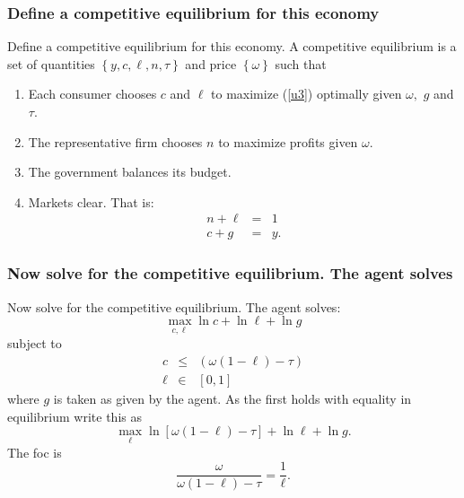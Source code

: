 \documentclass[aspectratio=169]{ltx-talk}
\begin{document}
\begin{frame}
\frametitle{Define a competitive equilibrium for this economy}
Define a competitive equilibrium for this economy.\newline
A competitive equilibrium is a set of quantities $\left\{ y,c,\ell ,n,\tau
\right\} $ and price $\left\{ \omega \right\} $ such that

\begin{enumerate}
\item Each consumer chooses $c$ and $\ell $ to maximize (\ref{u3}) optimally
given $\omega ,$ $g$ and $\tau $.

\item The representative firm chooses $n$ to maximize profits given $\omega
. $

\item The government balances its budget.

\item Markets clear. That is:%
\begin{eqnarray*}
n+\ell &=&1 \\
c+g &=&y.
\end{eqnarray*}
\end{enumerate}
\end{frame}

\begin{frame}
\frametitle{Now solve for the competitive equilibrium. The agent solves}
Now solve for the competitive equilibrium. The agent solves:%
\begin{equation*}
\underset{c,\ell }{\max }\ln c+\ln \ell +\ln g
\end{equation*}%
subject to%
\begin{eqnarray*}
c &\leq &\left( \omega \left( 1-\ell \right) -\tau \right) \\
\ell &\in &\left[ 0,1\right]
\end{eqnarray*}%
where $g$ is taken as given by the agent. As the first holds with equality
in equilibrium write this as 
\begin{equation*}
\underset{\ell }{\max }\ln \left[ \omega \left( 1-\ell \right) -\tau \right]
+\ln \ell +\ln g.
\end{equation*}%
The foc is 
\begin{equation}
\frac{\omega }{\omega \left( 1-\ell \right) -\tau }=\frac{1}{\ell }.
\label{foc4}
\end{equation}%
\end{frame}
\end{document}
